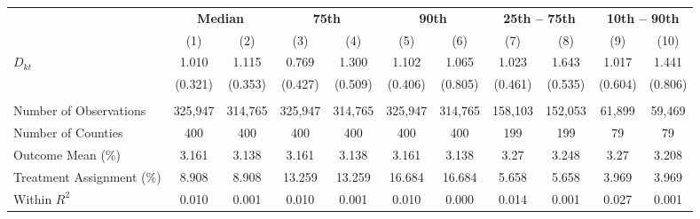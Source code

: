 \begin{tabular}{l*{1}cccccccccc}
\toprule
& \multicolumn{2}{c}{\textbf{Median}}
& \multicolumn{2}{c}{\textbf{75th}}
& \multicolumn{2}{c}{\textbf{90th}}
& \multicolumn{2}{c}{\textbf{25th -- 75th}}
& \multicolumn{2}{c}{\textbf{10th -- 90th}}
\\ 
& \multicolumn{1}{c}{(1)}
& \multicolumn{1}{c}{(2)}
& \multicolumn{1}{c}{(3)}
& \multicolumn{1}{c}{(4)}
& \multicolumn{1}{c}{(5)}
& \multicolumn{1}{c}{(6)}
& \multicolumn{1}{c}{(7)}
& \multicolumn{1}{c}{(8)}
& \multicolumn{1}{c}{(9)}
& \multicolumn{1}{c}{(10)}
\\ 



\midrule

$ D_{kt} $  &       1.010\sym{***}&       1.115\sym{***}&       0.769\sym{*}  &       1.300\sym{**} &       1.102\sym{***}&       1.065         &       1.023\sym{**} &       1.643\sym{***}&       1.017\sym{*}  &       1.441\sym{*}  \\
           &     (0.321)         &     (0.353)         &     (0.427)         &     (0.509)         &     (0.406)         &     (0.805)         &     (0.461)         &     (0.535)         &     (0.604)         &     (0.806)         \\
\\
Number of Observations&     325,947         &     314,765         &     325,947         &     314,765         &     325,947         &     314,765         &     158,103         &     152,053         &      61,899         &      59,469     \\
Number of Counties&         400         &         400         &         400         &         400         &         400   &         400         &         199         &         199         &          79         &          79         \\
Outcome Mean (\%)&       3.161         &       3.138         &       3.161         &       3.138         &       3.161    &       3.138         &        3.27         &       3.248         &        3.27         &       3.208         \\
Treatment Assignment (\%)&8.908         &8.908         &      13.259         &      13.259        &      16.684         &      16.684         &       5.658         &       5.658         &       3.969         &       3.969         
\\
Within $ R^2 $&       0.010         &       0.001         &       0.010         &       0.001         &       0.010       &       0.000         &       0.014         &       0.001         &       0.027         &       0.001         \\




\end{tabular}
